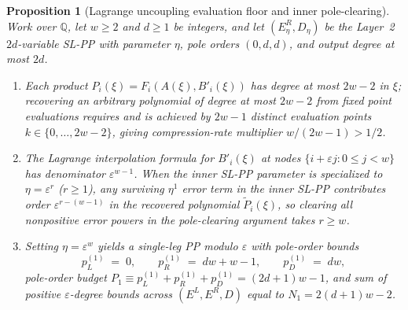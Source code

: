 \documentclass[11pt,a4paper]{article}
\theoremstyle{plain}
\newtheorem{proposition}[theorem]{Proposition}
\theoremstyle{definition}
\theoremstyle{remark}
\newcommand{\Q}{\mathbb{Q}}
\begin{document}
\begin{proposition}[Lagrange uncoupling evaluation floor and inner pole-clearing]
\label{prop:lagrange_poles}
Work over $\Q$, let $w \ge 2$ and $d \ge 1$ be integers, and let $(E_\eta^R, D_\eta)$ be the Layer~2 $2d$-variable SL-PP with parameter $\eta$, pole orders $(0, d, d)$, and output degree at most $2d$.
\begin{enumerate}[label=(\roman*)]
\item Each product $P_i(\xi) = F_i(A(\xi), B'_i(\xi))$ has degree at most $2w - 2$ in $\xi$; recovering an arbitrary polynomial of degree at most $2w - 2$ from fixed point evaluations requires and is achieved by $2w - 1$ distinct evaluation points $k \in \{0, \dots, 2w - 2\}$, giving compression-rate multiplier $w/(2w - 1) > 1/2$.
\item The Lagrange interpolation formula for $B'_i(\xi)$ at nodes $\{i + \varepsilon j : 0 \le j < w\}$ has denominator $\varepsilon^{w-1}$. When the inner SL-PP parameter is specialized to $\eta = \varepsilon^r$ ($r \ge 1$), any surviving $\eta^1$ error term in the inner SL-PP contributes order $\varepsilon^{r - (w - 1)}$ in the recovered polynomial $\widetilde{P}_i(\xi)$, so clearing all nonpositive error powers in the pole-clearing argument takes $r \ge w$.
\item Setting $\eta = \varepsilon^w$ yields a single-leg PP modulo $\varepsilon$ with pole-order bounds
\begin{equation}
    p_L^{(1)} \;=\; 0, \qquad p_R^{(1)} \;=\; d w + w - 1, \qquad p_D^{(1)} \;=\; d w ,
    \label{eq:single_leg_poles}
\end{equation}
pole-order budget $P_1 \equiv p_L^{(1)} + p_R^{(1)} + p_D^{(1)} = (2d + 1)w - 1$, and sum of positive $\varepsilon$-degree bounds across $(E^L, E^R, D)$ equal to $N_1 = 2(d + 1)w - 2$.
\end{enumerate}
\end{proposition}
\end{document}
